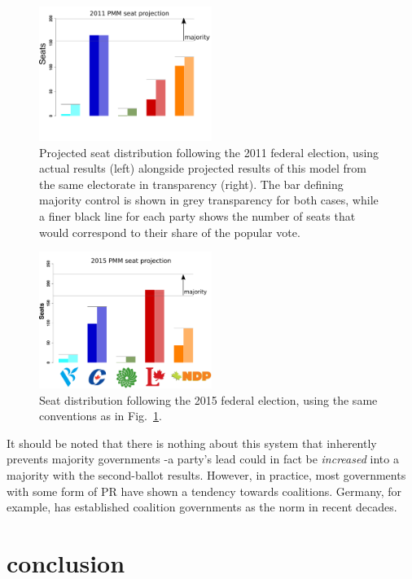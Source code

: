 \documentclass[DIV=calc, paper=a4, fontsize=11pt, twocolumn]{scrartcl}	 %
\begin{document}
\begin{figure}[h!]
  \includegraphics[width=0.50\textwidth,clip]{Figs/2011_seat_projection}
  \caption{ Projected seat distribution following the 2011 federal election, using actual results (left) alongside projected results of this model from the same electorate in transparency (right). The bar defining majority control is shown in grey transparency for both cases, while a finer black line for each party shows the number of seats that would correspond to their share of the popular vote.
}
\label{fig:hypo_2011}
\end{figure}

\begin{figure}[h!]
  \includegraphics[width=0.50\textwidth,clip]{Figs/2015_seat_projection}
  \caption{ Seat distribution following the 2015 federal election, using the same conventions as in Fig.~\ref{fig:hypo_2011}.}
\label{fig:hypo_2015}
\end{figure}

It should be noted that there is nothing about this system that inherently prevents majority governments \--a party's lead could in fact be \emph{increased} into a majority with the second-ballot results. However, in practice, most governments with some form of PR have shown a tendency towards coalitions. Germany, for example, has established coalition governments as the norm in recent decades.

\section{conclusion}	
\end{document}
